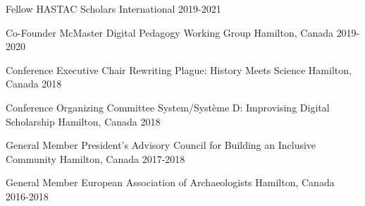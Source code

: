 

\begin{cvhonors}

  \cvhonor
    {Fellow} %
    {HASTAC Scholars} %
    {International} %
    {2019-2021} %

  \cvhonor
    {Co-Founder} %
    {McMaster Digital Pedagogy Working Group} %
    {Hamilton, Canada} %
    {2019-2020} %
    
  \cvhonor
    {Conference Executive Chair} %
    {Rewriting Plague: History Meets Science} %
    {Hamilton, Canada} %
    {2018} %
    
  \cvhonor
    {Conference Organizing Committee} %
    {System/Système D: Improvising Digital Scholarship} %
    {Hamilton, Canada} %
    {2018} %


  \cvhonor
    {General Member} %
    {President’s Advisory Council for Building an Inclusive Community} %
    {Hamilton, Canada} %
    {2017-2018} %
 
   \cvhonor
    {General Member} %
    {European Association of Archaeologists } %
    {Hamilton, Canada} %
    {2016-2018} %
    


\end{cvhonors}
